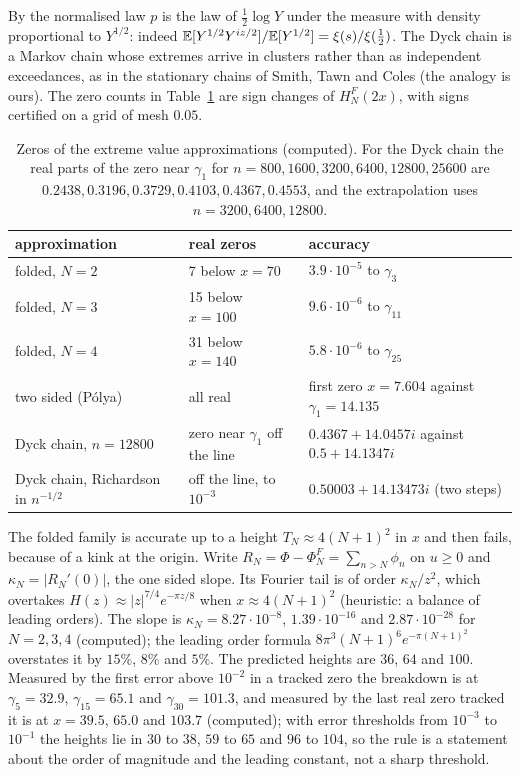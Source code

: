 By \cite{BPY01} the normalised law $p$ is the law of $\tfrac12\log Y$ under the measure with density proportional to $Y^{1/2}$: indeed $\mathbb{E}[Y^{1/2}Y^{iz/2}]/\mathbb{E}[Y^{1/2}]=\xi(s)/\xi(\tfrac12)$. The Dyck chain is a Markov chain whose extremes arrive in clusters rather than as independent exceedances, as in the stationary chains of Smith, Tawn and Coles \cite{SmithTawnColes97} (the analogy is ours). The zero counts in Table~\ref{ev:tab:approx} are sign changes of $H^F_N(2x)$, with signs certified on a grid of mesh $0.05$.

\begin{table}[h]\centering\footnotesize\setlength{\tabcolsep}{3pt}
\begin{tabular}{p{}p{}p{}}
\toprule
approximation & real zeros & accuracy\\
\midrule
folded, $N=2$ & 7 below $x=70$ & $3.9\cdot10^{-5}$ to $\gamma_3$\\
folded, $N=3$ & 15 below $x=100$ & $9.6\cdot10^{-6}$ to $\gamma_{11}$\\
folded, $N=4$ & 31 below $x=140$ & $5.8\cdot10^{-6}$ to $\gamma_{25}$\\
two sided (P\'olya) & all real & first zero $x=7.604$ against $\gamma_1=14.135$\\
Dyck chain, $n = 12800$ & zero near $\gamma_1$ off the line & $0.4367 + 14.0457i$ against $0.5 + 14.1347i$\\
Dyck chain, Richardson in $n^{-1/2}$ & off the line, to $10^{-3}$ & $0.50003 + 14.13473i$ (two steps)\\
\bottomrule
\end{tabular}
\caption{Zeros of the extreme value approximations (computed). For the Dyck chain the real parts of the zero near $\gamma_1$ for $n=800,\allowbreak1600,\allowbreak3200,\allowbreak6400,\allowbreak12800,\allowbreak25600$ are $0.2438,0.3196,0.3729,0.4103,0.4367,0.4553$, and the extrapolation uses $n=3200,\allowbreak6400,\allowbreak12800$.}\label{ev:tab:approx}
\end{table}

The folded family is accurate up to a height $T_N\approx4(N+1)^2$ in $x$ and then fails, because of a kink at the origin. Write $R_N=\Phi-\Phi^F_N=\sum_{n>N}\phi_n$ on $u\ge0$ and $\kappa_N=|R_N'(0)|$, the one sided slope. Its Fourier tail is of order $\kappa_N/z^2$, which overtakes $H(z)\approx|z|^{7/4}e^{-\pi z/8}$ when $x\approx4(N+1)^2$ (heuristic: a balance of leading orders). The slope is $\kappa_N=8.27\cdot10^{-8}$, $1.39\cdot10^{-16}$ and $2.87\cdot10^{-28}$ for $N=2,3,4$ (computed); the leading order formula $8\pi^3(N+1)^6e^{-\pi(N+1)^2}$ overstates it by $15\%$, $8\%$ and $5\%$. The predicted heights are $36$, $64$ and $100$. Measured by the first error above $10^{-2}$ in a tracked zero the breakdown is at $\gamma_5=32.9$, $\gamma_{15}=65.1$ and $\gamma_{30}=101.3$, and measured by the last real zero tracked it is at $x=39.5$, $65.0$ and $103.7$ (computed); with error thresholds from $10^{-3}$ to $10^{-1}$ the heights lie in $30$ to $38$, $59$ to $65$ and $96$ to $104$, so the rule is a statement about the order of magnitude and the leading constant, not a sharp threshold.

